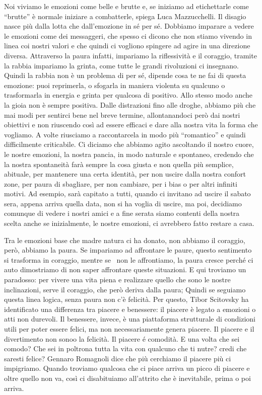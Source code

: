 \documentclass[12pt]{book} %
\begin{document}
\bigskip

Noi viviamo le emozioni come belle e brutte e, se iniziamo ad etichettarle come “brutte” è normale iniziare a
combatterle, spiega Luca Mazzucchelli. Il disagio nasce più dalla lotta che dall'emozione in sé
per sé. Dobbiamo imparare a vedere le emozioni come dei messaggeri, che spesso ci dicono che non stiamo vivendo in
linea coi nostri valori e che quindi ci vogliono spingere ad agire in una direzione diversa. Attraverso la paura
infatti, impariamo la riflessività e il coraggio, tramite la rabbia impariamo la grinta, come tutte le grandi
rivoluzioni ci insegnano. Quindi la rabbia non è un problema di per sé, dipende cosa te ne fai di questa emozione: puoi
reprimerla, o sfogarla in maniera violenta su qualcuno o trasformarla in energia e grinta per qualcosa di positivo.
Allo stesso modo anche la gioia non è sempre positiva. Dalle distrazioni fino alle droghe, abbiamo più che mai modi per
sentirci bene nel breve termine, allontanandoci però dai nostri obiettivi e non riuscendo così ad essere efficaci e
dare alla nostra vita la forma che vogliamo. A volte riusciamo a raccontarcela in modo più “romantico” e quindi
difficilmente criticabile. Ci diciamo che abbiamo agito ascoltando il nostro cuore, le nostre emozioni, la nostra
pancia, in modo naturale e spontaneo, credendo che la nostra spontaneità farà sempre la cosa giusta e non quella più
semplice, abituale, per mantenere una certa identità, per non uscire dalla nostra confort zone, per paura di sbagliare,
per non cambiare, per i bias o per altri infiniti motivi. Ad esempio, sarà capitato a tutti, quando ci invitano ad
uscire il sabato sera, appena arriva quella data, non si ha voglia di uscire, ma poi, decidiamo comunque di vedere i
nostri amici e a fine serata siamo contenti della nostra scelta anche se inizialmente, le nostre emozioni, ci avrebbero
fatto restare a casa.

Tra le emozioni base che madre natura ci ha donato, non abbiamo il coraggio, però, abbiamo la paura. Se impariamo ad
affrontare le paure, questo sentimento si trasforma in coraggio, mentre se \ non le affrontiamo, la paura cresce perché
ci auto dimostriamo di non saper affrontare queste situazioni. E qui troviamo un paradosso: per vivere una vita piena e
realizzare quello che sono le nostre inclinazioni, serve il coraggio, che però deriva dalla paura; Quindi se seguiamo
questa linea logica, senza paura non c'è felicità. Per questo, Tibor Scitovsky ha identificato una differenza tra
piacere e benessere: il piacere è legato a emozioni o atti non durevoli. Il benessere, invece, è una piattaforma
strutturale di condizioni utili per poter essere felici, ma non necessariamente genera piacere. 
Il piacere e il divertimento non sonoo la felicità. Il piacere é comodità. E una volta che sei comodo? Che sei in poltrona tutta la vita con qualcuno che ti nutre? credi che saresti felice?
Gennaro Romagnoli dice che più cerchiamo il piacere più ci impigriamo. Quando troviamo qualcosa che ci piace arriva un picco di piacere e oltre quello non va, così ci disabituiamo all'attrito che è inevitabile, prima o poi arriva.
\end{document}

